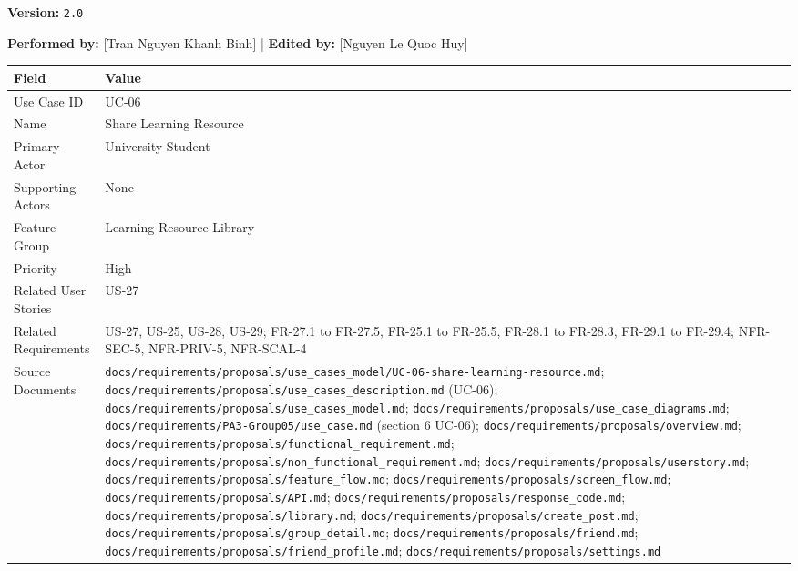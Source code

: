 \documentclass[12pt]{article}
\renewcommand{\baselinestretch}{1.5}
\begin{document}
\textbf{Version:} \texttt{2.0}
\par\medskip

\textbf{Performed by:} [Tran Nguyen Khanh Binh] | \textbf{Edited by:} [Nguyen Le Quoc Huy]
\par\medskip

\begingroup
\small
\renewcommand{\baselinestretch}{1.0}\selectfont
\renewcommand{\arraystretch}{1.15}
\setlength{\tabcolsep}{6pt}
\begin{longtable}{|>{\raggedright\arraybackslash}p{}|>{\raggedright\arraybackslash}p{}|}
\hline
\textbf{Field} & \textbf{Value} \\ \hline
\endhead
Use Case ID & UC-06 \\ \hline
Name & Share Learning Resource \\ \hline
Primary Actor & University Student \\ \hline
Supporting Actors & None \\ \hline
Feature Group & Learning Resource Library \\ \hline
Priority & High \\ \hline
Related User Stories & US-27 \\ \hline
Related Requirements & US-27, US-25, US-28, US-29; FR-27.1 to FR-27.5, FR-25.1 to FR-25.5, FR-28.1 to FR-28.3, FR-29.1 to FR-29.4; NFR-SEC-5, NFR-PRIV-5, NFR-SCAL-4 \\ \hline
Source Documents & \texttt{docs/requirements/proposals/use\_cases\_model/UC-06-share-learning-resource.md}; \texttt{docs/requirements/proposals/use\_cases\_description.md} (UC-06); \texttt{docs/requirements/proposals/use\_cases\_model.md}; \texttt{docs/requirements/proposals/use\_case\_diagrams.md}; \texttt{docs/requirements/PA3-Group05/use\_case.md} (section 6 UC-06); \texttt{docs/requirements/proposals/overview.md}; \texttt{docs/requirements/proposals/functional\_requirement.md}; \texttt{docs/requirements/proposals/non\_functional\_requirement.md}; \texttt{docs/requirements/proposals/userstory.md}; \texttt{docs/requirements/proposals/feature\_flow.md}; \texttt{docs/requirements/proposals/screen\_flow.md}; \texttt{docs/requirements/proposals/API.md}; \texttt{docs/requirements/proposals/response\_code.md}; \texttt{docs/requirements/proposals/library.md}; \texttt{docs/requirements/proposals/create\_post.md}; \texttt{docs/requirements/proposals/group\_detail.md}; \texttt{docs/requirements/proposals/friend.md}; \texttt{docs/requirements/proposals/friend\_profile.md}; \texttt{docs/requirements/proposals/settings.md} \\ \hline
\end{longtable}
\endgroup
\par\medskip
\end{document}
